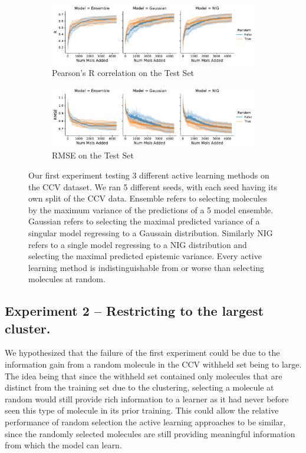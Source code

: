 \documentclass[journal=jmcmar,manuscript=article]{achemso}
\begin{document}
\begin{figure}[tbph]
    \centering
    \begin{subfigure}[b]{0.48\textwidth}
        \includegraphics[width=1\linewidth]{figures/fig2_initial_results_R.pdf}
        \caption{Pearson's R correlation on the Test Set}
    \end{subfigure}%
    \hfill
    \begin{subfigure}[b]{0.48\textwidth}
        \includegraphics[width=1\linewidth]{figures/fig2_initial_results_RMSE.pdf}
        \caption{RMSE on the Test Set}
    \end{subfigure}
    \caption{Our first experiment testing 3 different active learning methods on the CCV dataset. We ran 5 different seeds, with each seed having its own split of the CCV data. Ensemble refers to selecting molecules by the maximum variance of the predictions of a 5 model ensemble. Gaussian refers to selecting the maximal predicted variance of a singular model regressing to a Gaussain distribution. Similarly NIG refers to a single model regressing to a NIG distribution and selecting the maximal predicted epistemic variance. Every active learning method is indistinguishable from or worse than selecting molecules at random.}
    \label{fig:initialresults}
\end{figure}

\subsection{Experiment 2 -- Restricting to the largest cluster.}
We hypothesized that the failure of the first experiment could be due to the information gain from a random molecule in the CCV withheld set being to large. The idea being that since the withheld set contained only molecules that are distinct from the training set due to the clustering, selecting a molecule at random would still provide rich information to a learner as it had never before seen this type of molecule in its prior training. This could allow the relative performance of random selection the active learning approaches to be similar, since the randomly selected molecules are still providing meaningful information from which the model can learn.
\end{document}
